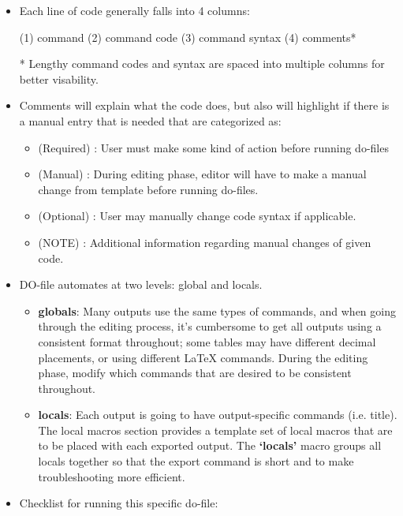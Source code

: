 \documentclass[12pt]{article}
\begin{document}
\begin{itemize}


\item Each line of code generally falls into 4 columns:

(1) command (2) command code (3) command syntax (4) comments*
 
* Lengthy command codes and syntax are spaced into multiple columns for better visability.



\item Comments will explain what the code does, but also will highlight if there is a manual entry that is needed that are categorized as:

\begin{itemize}
\item (Required)  : User must make some kind of action before running do-files
\item (Manual)   	: During editing phase, editor will have to make a manual change from template before running do-files.
\item (Optional)    	: User may manually change code syntax if applicable.
\item (NOTE)        	: Additional information regarding manual changes of given code.
\end{itemize}

\item DO-file automates at two levels: global and locals.

\begin{itemize}
\item \textbf{globals}: Many outputs use the same types of commands, and when going through the editing process, it's cumbersome to get all outputs using a consistent format throughout; some tables may have different decimal placements, or using different LaTeX commands. During the editing phase, modify which commands that are desired to be consistent throughout.

\item \textbf{locals}: Each output is going to have output-specific commands (i.e. title). The local macros section provides a template set of local macros that are to be placed with each exported output. The \textbf{`locals'} macro groups all locals together so that the export command is short and to make troubleshooting more efficient.
\end{itemize}

\item Checklist for running this specific do-file: 
\begin{itemize}


\end{itemize}
\end{itemize}
\end{document}
